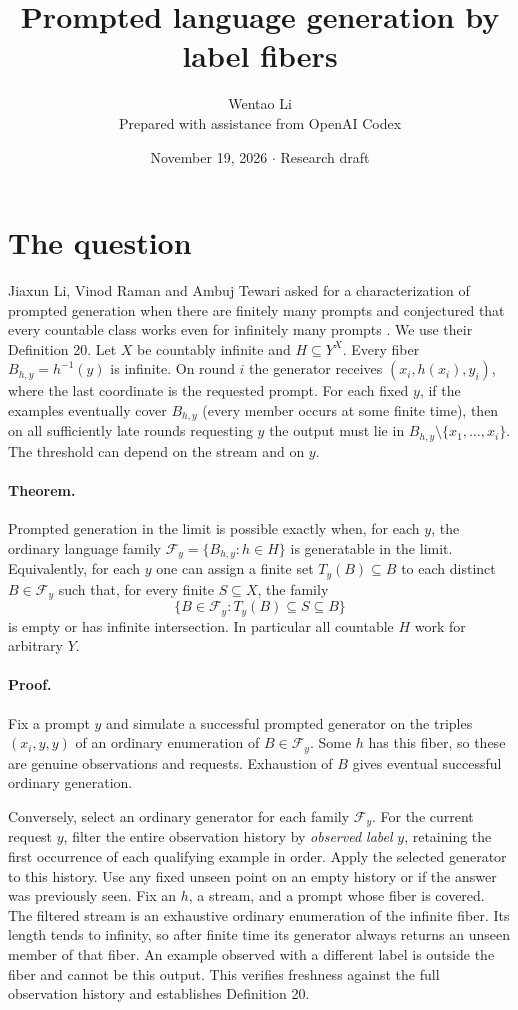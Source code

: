 \documentclass[11pt]{article}
\title{Prompted language generation by label fibers}
\author{Wentao Li\\{\small Prepared with assistance from OpenAI Codex}}
\date{November 19, 2026 \quad $\cdot$ \quad Research draft}
\begin{document}
\maketitle
\section*{The question}
Jiaxun Li, Vinod Raman and Ambuj Tewari asked for a characterization of prompted generation when there are finitely many prompts and conjectured that every countable class works even for infinitely many prompts \cite{lrt}. We use their Definition 20. Let $X$ be countably infinite and $H\subseteq Y^X$. Every fiber $B_{h,y}=h^{-1}(y)$ is infinite. On round $i$ the generator receives $(x_i,h(x_i),y_i)$, where the last coordinate is the requested prompt. For each fixed $y$, if the examples eventually cover $B_{h,y}$ (every member occurs at some finite time), then on all sufficiently late rounds requesting $y$ the output must lie in $B_{h,y}\setminus\{x_1,\ldots,x_i\}$. The threshold can depend on the stream and on $y$.

\paragraph{Theorem.} Prompted generation in the limit is possible exactly when, for each $y$, the ordinary language family $\mathcal F_y=\{B_{h,y}:h\in H\}$ is generatable in the limit. Equivalently, for each $y$ one can assign a finite set $T_y(B)\subseteq B$ to each distinct $B\in\mathcal F_y$ such that, for every finite $S\subseteq X$, the family
\[
 \{B\in\mathcal F_y:T_y(B)\subseteq S\subseteq B\}
\]
is empty or has infinite intersection. In particular all countable $H$ work for arbitrary $Y$.

\paragraph{Proof.} Fix a prompt $y$ and simulate a successful prompted generator on the triples $(x_i,y,y)$ of an ordinary enumeration of $B\in\mathcal F_y$. Some $h$ has this fiber, so these are genuine observations and requests. Exhaustion of $B$ gives eventual successful ordinary generation.

Conversely, select an ordinary generator for each family $\mathcal F_y$. For the current request $y$, filter the entire observation history by \emph{observed label} $y$, retaining the first occurrence of each qualifying example in order. Apply the selected generator to this history. Use any fixed unseen point on an empty history or if the answer was previously seen. Fix an $h$, a stream, and a prompt whose fiber is covered. The filtered stream is an exhaustive ordinary enumeration of the infinite fiber. Its length tends to infinity, so after finite time its generator always returns an unseen member of that fiber. An example observed with a different label is outside the fiber and cannot be this output. This verifies freshness against the full observation history and establishes Definition 20.
\end{document}
